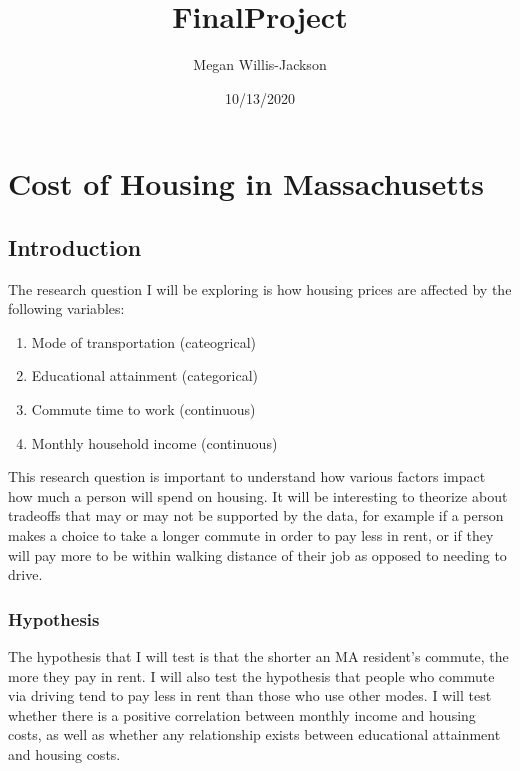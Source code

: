 \documentclass[
]{article}
\title{FinalProject}
\author{Megan Willis-Jackson}
\date{10/13/2020}
\providecommand{\tightlist}{%
  \setlength{\itemsep}{0pt}\setlength{\parskip}{0pt}}
\begin{document}
\maketitle

\hypertarget{cost-of-housing-in-massachusetts}{%
\section{Cost of Housing in
Massachusetts}\label{cost-of-housing-in-massachusetts}}

\hypertarget{introduction}{%
\subsection{Introduction}\label{introduction}}

The research question I will be exploring is how housing prices are
affected by the following variables:

\begin{enumerate}
\def\labelenumi{\arabic{enumi}.}
\tightlist
\item
  Mode of transportation (cateogrical)
\item
  Educational attainment (categorical)
\item
  Commute time to work (continuous)
\item
  Monthly household income (continuous)
\end{enumerate}

This research question is important to understand how various factors
impact how much a person will spend on housing. It will be interesting
to theorize about tradeoffs that may or may not be supported by the
data, for example if a person makes a choice to take a longer commute in
order to pay less in rent, or if they will pay more to be within walking
distance of their job as opposed to needing to drive.

\hypertarget{hypothesis}{%
\subsubsection{Hypothesis}\label{hypothesis}}

The hypothesis that I will test is that the shorter an MA resident's
commute, the more they pay in rent. I will also test the hypothesis that
people who commute via driving tend to pay less in rent than those who
use other modes. I will test whether there is a positive correlation
between monthly income and housing costs, as well as whether any
relationship exists between educational attainment and housing costs.
\end{document}
